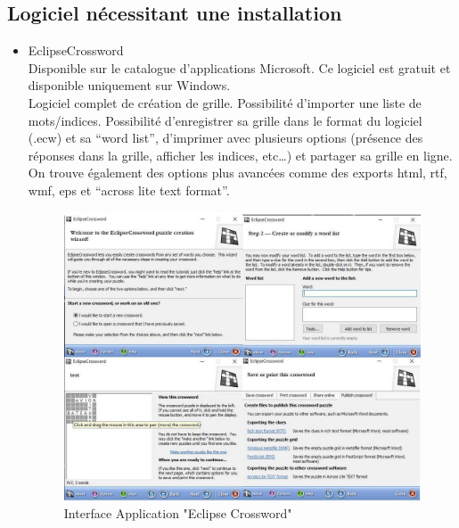 \documentclass [ 11 pt ] {article}
\begin{document}
    \newpage
    \subsection{Logiciel nécessitant une installation}
    \begin{itemize}
        
         \item EclipseCrossword\cite{Ec}
        \\ Disponible sur le catalogue d'applications Microsoft. Ce logiciel est gratuit et disponible uniquement sur Windows.
        \\ Logiciel complet de création de grille.
        Possibilité d’importer une liste de mots/indices.
        Possibilité d’enregistrer sa grille dans le format du logiciel (.ecw) et sa “word list”, d’imprimer avec plusieurs options (présence des réponses dans la grille, afficher les indices, etc…) et partager sa grille en ligne.
        On trouve également des options plus avancées comme des exports html, rtf, wmf, eps et “across lite text format”.
        
        \begin{center}
            \begin{figure}[H]
                \begin{center}
                    \includegraphics[scale=0.55]{eclipsecrossword.jpg}
                    \caption{Interface Application "Eclipse Crossword" }
                    \label{Pres}
                \end{center}
            \end{figure}
        \end{center}
        

\end{itemize}
\end{document}
